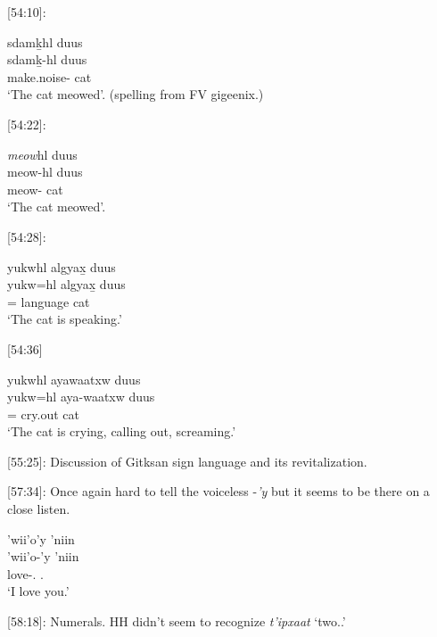 [54:10]:
\begin{exe} \ex 
    \glll 
    sdamḵhl duus \\
    sdamḵ-hl duus \\
    make.noise-\Cn{} cat \\
    \glt `The cat meowed'. (spelling from FV gigeenix.)
\end{exe}

[54:22]:
\begin{exe} \ex 
    \glll 
    \textit{meow}hl duus \\
    meow-hl duus \\
    meow-\Cn{} cat \\
    \glt `The cat meowed'.
\end{exe}

[54:28]:
\begin{exe}
    \ex \glll
    yukwhl algyax̱ duus \\
    yukw=hl algyax̱ duus \\
    \Prog{}=\Cn{} language cat \\
    \glt `The cat is speaking.'
\end{exe}

[54:36]
\begin{exe}
    \ex \glll
    yukwhl ayawaatxw duus \\
    yukw=hl aya-waatxw duus \\
    \Prog{}=\Cn{} cry.out cat \\
    \glt `The cat is crying, calling out, screaming.'
\end{exe}

[55:25]: Discussion of Gitksan  sign language and its revitalization.

[57:34]: Once again hard to tell the voiceless -\textit{'y} but it seems to be there on a close listen.
\begin{exe}
    \ex \glll
    'wii'o'y 'niin \\
    'wii'o-'y 'niin \\
    love-\Fsg.\Ii{} \Ssg.\Iii \\
    \glt `I love you.'
\end{exe}

[58:18]: Numerals. HH didn't seem to recognize \textit{t'ipxaat} `two.\Anim{}.' 

\begin{exe}
\end{exe}

